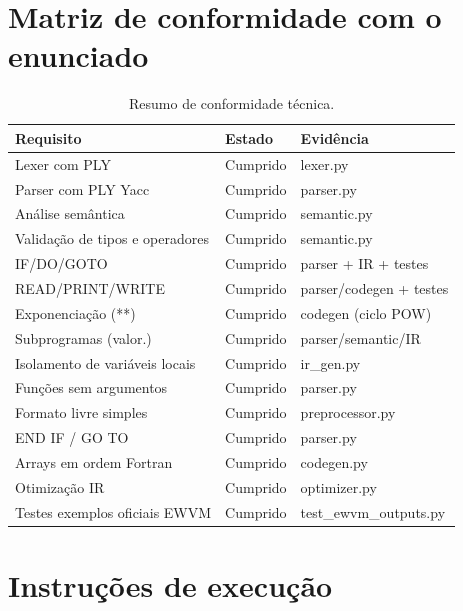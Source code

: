 \documentclass{article}
\begin{document}
\section{Matriz de conformidade com o enunciado}
\label{anexo:conformidade}

\begin{table}[H]
\centering
\begin{tabular}{p{} p{} p{}}
\toprule
\textbf{Requisito} & \textbf{Estado} & \textbf{Evidência} \\
\midrule
Lexer com PLY                   & Cumprido & lexer.py \\
Parser com PLY Yacc             & Cumprido & parser.py \\
Análise semântica               & Cumprido & semantic.py \\
Validação de tipos e operadores & Cumprido & semantic.py \\
IF/DO/GOTO                      & Cumprido & parser + IR + testes \\
READ/PRINT/WRITE                & Cumprido & parser/codegen + testes \\
Exponenciação (**)              & Cumprido & codegen (ciclo POW) \\
Subprogramas (valor.)           & Cumprido & parser/semantic/IR \\
Isolamento de variáveis locais  & Cumprido & ir\_gen.py \\
Funções sem argumentos          & Cumprido & parser.py \\
Formato livre simples           & Cumprido & preprocessor.py \\
END IF / GO TO                  & Cumprido & parser.py \\
Arrays em ordem Fortran         & Cumprido & codegen.py \\
Otimização IR                   & Cumprido & optimizer.py \\
Testes exemplos oficiais EWVM   & Cumprido & test\_ewvm\_outputs.py \\
\bottomrule
\end{tabular}
\caption{Resumo de conformidade técnica.}
\label{tab:compliance}
\end{table}

\section{Instruções de execução}
\label{anexo:execucao}
\end{document}
